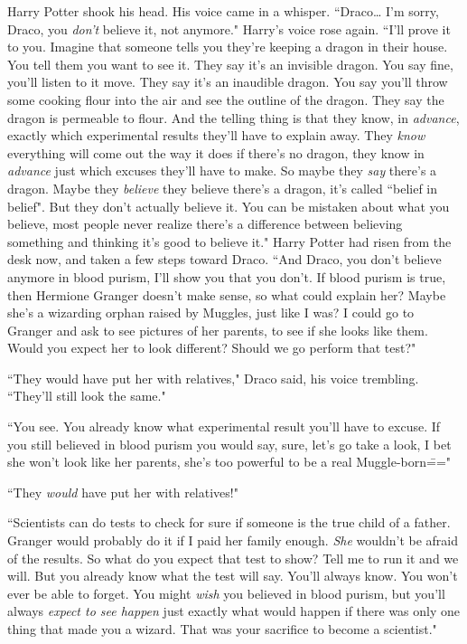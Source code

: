 Harry Potter shook his head. His voice came in a whisper. ``Draco{\ldots} I'm sorry, Draco, you \emph{don't} believe it, not anymore." Harry's voice rose again. ``I'll prove it to you. Imagine that someone tells you they're keeping a dragon in their house. You tell them you want to see it. They say it's an invisible dragon. You say fine, you'll listen to it move. They say it's an inaudible dragon. You say you'll throw some cooking flour into the air and see the outline of the dragon. They say the dragon is permeable to flour. And the telling thing is that they know, in \emph{advance}, exactly which experimental results they'll have to explain away. They \emph{know} everything will come out the way it does if there's no dragon, they know in \emph{advance} just which excuses they'll have to make. So maybe they \emph{say} there's a dragon. Maybe they \emph{believe} they believe there's a dragon, it's called ``belief in belief". But they don't actually believe it. You can be mistaken about what you believe, most people never realize there's a difference between believing something and thinking it's good to believe it." Harry Potter had risen from the desk now, and taken a few steps toward Draco. ``And Draco, you don't believe anymore in blood purism, I'll show you that you don't. If blood purism is true, then Hermione Granger doesn't make sense, so what could explain her? Maybe she's a wizarding orphan raised by Muggles, just like I was? I could go to Granger and ask to see pictures of her parents, to see if she looks like them. Would you expect her to look different? Should we go perform that test?"

``They would have put her with relatives," Draco said, his voice trembling. ``They'll still look the same."

``You see. You already know what experimental result you'll have to excuse. If you still believed in blood purism you would say, sure, let's go take a look, I bet she won't look like her parents, she's too powerful to be a real Muggle-born\==="

``They \emph{would} have put her with relatives!"

``Scientists can do tests to check for sure if someone is the true child of a father. Granger would probably do it if I paid her family enough. \emph{She} wouldn't be afraid of the results. So what do you expect that test to show? Tell me to run it and we will. But you already know what the test will say. You'll always know. You won't ever be able to forget. You might \emph{wish} you believed in blood purism, but you'll always \emph{expect to see happen} just exactly what would happen if there was only one thing that made you a wizard. That was your sacrifice to become a scientist."

